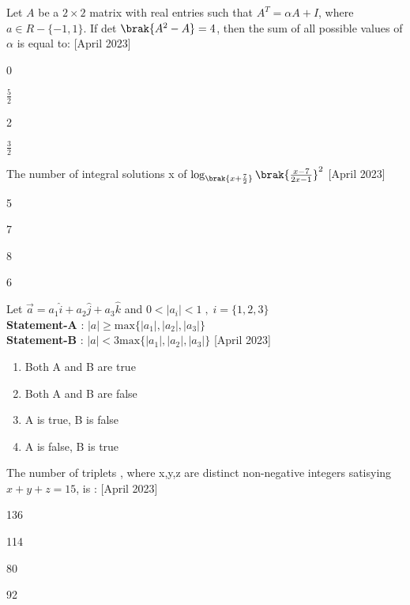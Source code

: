  \bigskip
 \item Let $A$ be a $2 \times 2$ matrix with real entries such that $A^{T}=\alpha A + I$, where $a \in R -\{-1,1\}$. If det $\brak{A^2-A}=4$, then the sum of all possible values of $\alpha$ is equal to: \hfill{[April 2023]}
 \begin{enumerate}
     \begin{multicols}{4}
         \item 0
         \item $\frac{5}{2}$
         \item 2
         \item $\frac{3}{2}$
     \end{multicols}
 \end{enumerate}
\bigskip
 \item The number of integral solutions x of $\log_{\brak{x+\frac{7}{2}}}{\brak{\frac{x-7}{2x-1}}}^2$ \hfill{[April 2023]}
 \begin{enumerate}
     \begin{multicols}{4}
         \item 5
         \item 7
         \item 8
         \item 6
     \end{multicols}
 \end{enumerate}
 \bigskip
 \item Let $\overset{\rightarrow}{a}=a_1\hat{i}+a_2\hat{j}+a_3\hat{k}$ and $0<|a_i|<1\;,\;i=\{1,2,3\}$\\
\textbf{Statement-A} : $|a|\ge \text{max}\{|a_1|,|a_2|,|a_3|\}$ \\
\textbf{Statement-B} : $|a|< \text{3max}\{|a_1|,|a_2|,|a_3|\}$ \hfill{[April 2023]}
\begin{enumerate}
    \item Both A and B are true
    \item Both A and B are false
    \item A is true, B is false
    \item A is false, B is true
\end{enumerate}
\bigskip
 \item The number of triplets , where x,y,z are distinct non-negative integers satisying $x+y+z=15$, is : \hfill{[April 2023]}
 \begin{enumerate}
    \begin{multicols}{4}
    \item 136
    \item 114
    \item 80
    \item 92
    \end{multicols}
        \end{enumerate}
